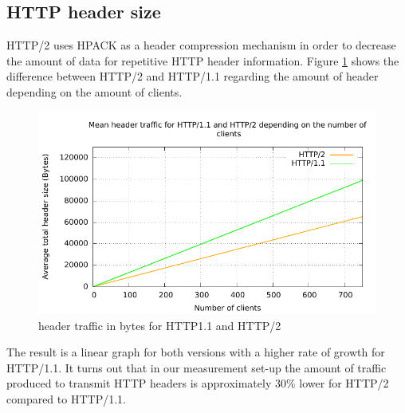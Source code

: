 \subsection{HTTP header size}
\label{subsec:header_size}

HTTP/2 uses HPACK \cite{hpack} as a header compression mechanism in order to decrease the amount of data for repetitive HTTP header information. Figure \ref{fig:headersize} shows the difference between HTTP/2 and HTTP/1.1 regarding the amount of header depending on the amount of clients.

\begin{figure}[H]
	\centering
	\includegraphics[scale=1,trim=0.0cm .0cm .0cm .0cm,clip]{images/headertraffic.pdf}
	\caption{header traffic in bytes for HTTP1.1 and HTTP/2}
	\label{fig:headersize}
\end{figure}

The result is a linear graph for both versions with a higher rate of growth for HTTP/1.1. It turns out that in our measurement set-up the amount of traffic produced to transmit HTTP headers is approximately 30\% lower for HTTP/2 compared to HTTP/1.1. 
